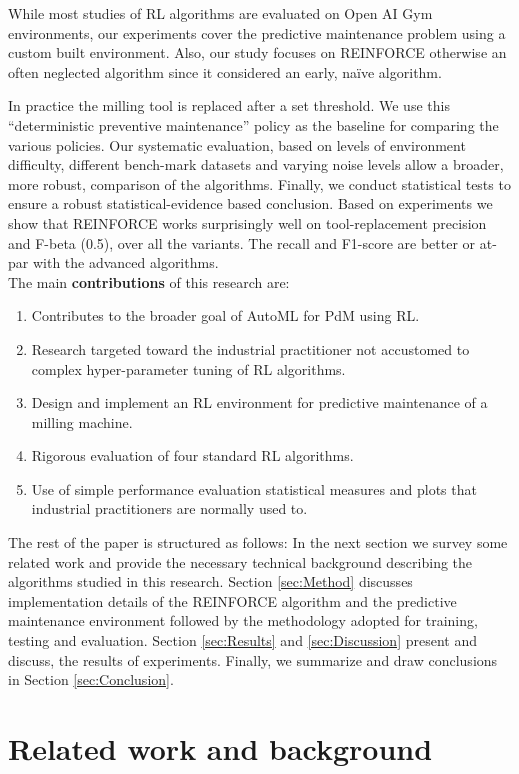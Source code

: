 \documentclass[a4paper, 12pt]{article}
\begin{document}
While most studies of RL algorithms are evaluated on Open AI Gym environments, our experiments cover the predictive maintenance problem using a custom built environment. Also, our study focuses on REINFORCE otherwise an often neglected algorithm since it considered an early, na\"ive algorithm. 

In practice the milling tool is replaced after a set threshold. We use this ``deterministic preventive maintenance'' policy as the baseline for comparing the various policies. Our systematic evaluation, based on levels of environment difficulty, different bench-mark datasets and varying noise levels allow a broader, more robust, comparison of the algorithms. Finally, we conduct statistical tests to ensure a robust statistical-evidence based conclusion. Based on experiments we show that REINFORCE works surprisingly well on tool-replacement precision and F-beta (0.5), over all the variants. The recall and F1-score are better or at-par with the advanced algorithms.\\

The main \textbf{contributions} of this research are:
\begin{enumerate}
	\item Contributes to the broader goal of AutoML for PdM using RL.
	\item Research targeted toward the industrial practitioner not accustomed to complex hyper-parameter tuning of RL algorithms.
	\item Design and implement an RL environment for predictive maintenance of a milling machine.
	\item Rigorous evaluation of four standard RL algorithms.
	\item Use of simple performance evaluation statistical measures and plots that industrial practitioners are normally used to.
\end{enumerate} 

The rest of the paper is structured as follows: In the next section we survey some related work and provide the necessary technical background describing the algorithms studied in this research. Section \ref{sec:Method} discusses implementation details of the REINFORCE algorithm and the predictive maintenance environment followed by the methodology adopted for training, testing and evaluation. Section \ref{sec:Results} and \ref{sec:Discussion} present and discuss, the results of experiments. Finally, we summarize and draw conclusions in Section \ref{sec:Conclusion}.

\section{Related work and background}\label{sec:SLR}
\end{document}
